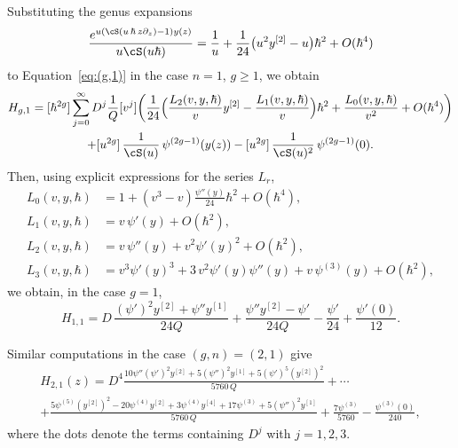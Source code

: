 Substituting the genus expansions
\begin{equation}\label{eq:V-exp}
\frac{e^{u(\cS(u\,\hbar\, z\partial_{z})-1)y(z)}}{u\cS(u\hbar)}
=\frac{1}{u}+\frac{1}{24} \bigl(u^2 y^{[2]}-u \bigr)\hbar ^2 +O(\hbar^4)
\end{equation}
to Equation~\eqref{eq:(g,1)} in the case $n=1$, $g\ge1$, we obtain
\begin{multline*}
H_{g,1} =[\hbar^{2g}]\sum_{j=0}^\infty D^j \frac{1}{Q}[v^j]
\biggl(\frac1{24} \Bigl(\frac{L_2(v,y,\hbar)}{v}y^{[2]}-\frac{L_1(v,y,\hbar)}{v} \Bigr)\hbar^2
+\frac{L_0(v,y,\hbar)}{v^2}+O(\hbar^4) \biggr)
\\
+[u^{2g}]\,\frac1{\cS(u)}\, \psi^{(2g-1)}(y(z))
-[u^{2g}]\,\frac1{\cS(u)^2}\, \psi^{(2g-1)}(0).
\end{multline*}
Then, using explicit expressions for the series $L_r$,
\begin{equation}\label{eq:L-exp}
\begin{aligned}
L_0(v,y,\hbar)&=1+(v^3- v)\frac{\psi ''(y)}{24} \hbar ^2+O(\hbar^4),\\
L_1(v,y,\hbar)&=v\,\psi'(y)+O(\hbar^2),\\
L_2(v,y,\hbar)&=v\,\psi ''(y)+v^2 \psi '(y)^2+O(\hbar^2),\\
L_3(v,y,\hbar)&=v^3 \psi '(y)^3+3\,v^2 \psi '(y) \psi ''(y)+v\,\psi ^{(3)}(y)+O(\hbar^2),
\end{aligned}
\end{equation}
we obtain, in the case $g=1$,
\begin{equation*}
H_{1,1}
=D\,\frac{\left(\psi'\right)^2 y^{[2]}+\psi''y^{[1]}}{24Q}+
\frac{\psi'' y^{[2]}-\psi'}{24Q}-\frac{\psi'}{24}+\frac{\psi'(0)}{12}.
\end{equation*}

Similar computations in the case $(g,n)=(2,1)$ give
\begin{multline*}
H_{2,1}(z) =D^4\frac{10 \psi'' \left(\psi'\right)^2 y^{[2]}+5 \left(\psi''\right)^2 y^{[1]}+5 \left(\psi'\right)^5 \left(y^{[2]}\right)^2}{5760\,Q}
+\cdots\\
+\frac{5 \psi^{(5)} \left(y^{[2]}\right)^2-20 \psi^{(4)} y^{[2]}+3 \psi^{(4)} y^{[4]}+17 \psi^{(3)}+5 \left(\psi''\right)^2 y^{[1]}}{5760\,Q}
+\frac{7\psi^{(3)}}{5760}-\frac{\psi ^{(3)}(0)}{240},
\end{multline*}
where the dots denote the terms containing $D^j$ with $j=1,2,3$.

